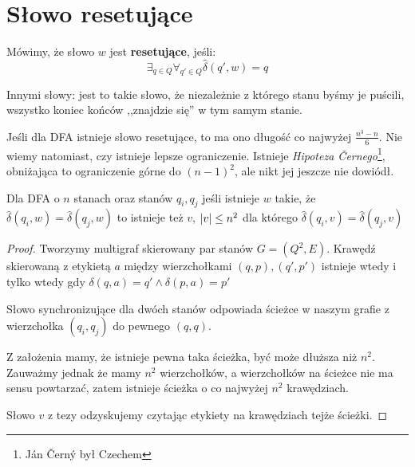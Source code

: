 \section{Słowo resetujące}
\begin{definition}
Mówimy, że słowo \(w\) jest \textbf{resetujące}, jeśli:
\[ 
    \exists_{q \in Q} \forall_{q' \in Q} \hat\delta(q',w) = q
\]
\end{definition}

Innymi słowy: jest to takie słowo, że niezależnie z którego stanu byśmy je puścili, wszystko koniec końców ,,znajdzie się'' w tym samym stanie.

Jeśli dla DFA istnieje słowo resetujące, to ma ono długość co najwyżej \(\frac{n^3 -n}{6}\). Nie wiemy natomiast, czy istnieje lepsze ograniczenie. Istnieje \textit{Hipoteza Černego}\footnote{Ján Černý był Czechem}, obniżająca to ograniczenie górne do \((n-1)^2\), ale nikt jej jeszcze nie dowiódł. 

\begin{lemma}
    Dla DFA o \( n \) stanach oraz stanów \( q_i, q_j \) jeśli istnieje \( w \) takie, że \( \widehat \delta(q_i, w) = \widehat \delta(q_j, w) \) to istnieje też \( v \), \( \card{v} \leq n^2 \) dla którego \( \widehat \delta(q_i, v) = \widehat \delta(q_j, v) \) 
\end{lemma}
\begin{proof}
    Tworzymy multigraf skierowany par stanów \( G = (Q^2, E) \).
    Krawędź skierowaną z etykietą \( a \) między wierzchołkami \( (q, p), (q', p') \) istnieje wtedy i tylko wtedy gdy \( \delta(q, a) = q' \land \delta(p, a) = p' \)
    
    Słowo synchronizujące dla dwóch stanów odpowiada ścieżce w naszym grafie z wierzchołka \( (q_i, q_j) \) do pewnego \( (q, q) \).
    
    Z założenia mamy, że istnieje pewna taka ścieżka, być może dłuższa niż \( n^2 \). Zauważmy jednak że mamy \( n^2 \) wierzchołków, a wierzchołków na ścieżce nie ma sensu powtarzać, zatem istnieje ścieżka o co najwyżej \( n^2 \) krawędziach.
    
    Słowo \( v \) z tezy odzyskujemy czytając etykiety na krawędziach tejże ścieżki.
\end{proof}


